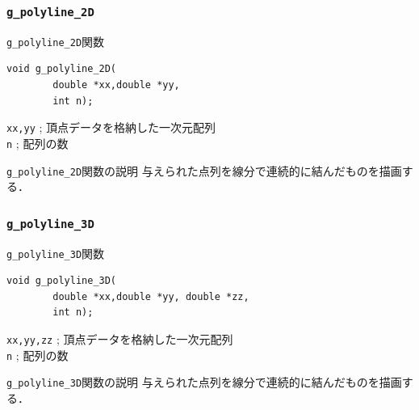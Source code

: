 \documentclass[a4paper,12pt]{jsarticle}%
\begin{document}
\clearpage
\subsubsection{\texttt{g\_polyline\_2D}}

\begin{itembox}[l]{\texttt{g\_polyline\_2D}関数}
\begin{verbatim}
void g_polyline_2D(
        double *xx,double *yy,
        int n);
\end{verbatim}
\verb|xx,yy| ; 頂点データを格納した一次元配列\\
\verb|n| ; 配列の数\\
\end{itembox}

\begin{itembox}[l]{\texttt{g\_polyline\_2D}関数の説明}
与えられた点列を線分で連続的に結んだものを描画する．
\end{itembox}




\clearpage
\subsubsection{\texttt{g\_polyline\_3D}}

\begin{itembox}[l]{\texttt{g\_polyline\_3D}関数}
\begin{verbatim}
void g_polyline_3D(
        double *xx,double *yy, double *zz,
        int n);
\end{verbatim}
\verb|xx,yy,zz| ; 頂点データを格納した一次元配列\\
\verb|n| ; 配列の数\\
\end{itembox}

\begin{itembox}[l]{\texttt{g\_polyline\_3D}関数の説明}
与えられた点列を線分で連続的に結んだものを描画する．
\end{itembox}
\end{document}
